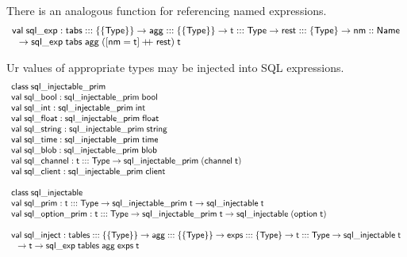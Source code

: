 \documentclass{article}
\newcommand{\mt}[1]{\mathsf{#1}}
\newcommand{\rc}{+ \hspace{-.075in} + \;}
\begin{document}
There is an analogous function for referencing named expressions.
$$\begin{array}{l}
  \mt{val} \; \mt{sql\_exp} : \mt{tabs} ::: \{\{\mt{Type}\}\} \to \mt{agg} ::: \{\{\mt{Type}\}\} \to \mt{t} ::: \mt{Type} \to \mt{rest} ::: \{\mt{Type}\} \to \mt{nm} :: \mt{Name} \\
  \hspace{.1in} \to \mt{sql\_exp} \; \mt{tabs} \; \mt{agg} \; ([\mt{nm} = \mt{t}] \rc \mt{rest}) \; \mt{t}
\end{array}$$

Ur values of appropriate types may be injected into SQL expressions.
$$\begin{array}{l}
  \mt{class} \; \mt{sql\_injectable\_prim} \\
  \mt{val} \; \mt{sql\_bool} : \mt{sql\_injectable\_prim} \; \mt{bool} \\
  \mt{val} \; \mt{sql\_int} : \mt{sql\_injectable\_prim} \; \mt{int} \\
  \mt{val} \; \mt{sql\_float} : \mt{sql\_injectable\_prim} \; \mt{float} \\
  \mt{val} \; \mt{sql\_string} : \mt{sql\_injectable\_prim} \; \mt{string} \\
  \mt{val} \; \mt{sql\_time} : \mt{sql\_injectable\_prim} \; \mt{time} \\
  \mt{val} \; \mt{sql\_blob} : \mt{sql\_injectable\_prim} \; \mt{blob} \\
  \mt{val} \; \mt{sql\_channel} : \mt{t} ::: \mt{Type} \to \mt{sql\_injectable\_prim} \; (\mt{channel} \; \mt{t}) \\
  \mt{val} \; \mt{sql\_client} : \mt{sql\_injectable\_prim} \; \mt{client} \\
  \\
  \mt{class} \; \mt{sql\_injectable} \\
  \mt{val} \; \mt{sql\_prim} : \mt{t} ::: \mt{Type} \to \mt{sql\_injectable\_prim} \; \mt{t} \to \mt{sql\_injectable} \; \mt{t} \\
  \mt{val} \; \mt{sql\_option\_prim} : \mt{t} ::: \mt{Type} \to \mt{sql\_injectable\_prim} \; \mt{t} \to \mt{sql\_injectable} \; (\mt{option} \; \mt{t}) \\
  \\
  \mt{val} \; \mt{sql\_inject} : \mt{tables} ::: \{\{\mt{Type}\}\} \to \mt{agg} ::: \{\{\mt{Type}\}\} \to \mt{exps} ::: \{\mt{Type}\} \to \mt{t} ::: \mt{Type} \to \mt{sql\_injectable} \; \mt{t} \\
  \hspace{.1in} \to \mt{t} \to \mt{sql\_exp} \; \mt{tables} \; \mt{agg} \; \mt{exps} \; \mt{t}
\end{array}$$
\end{document}
